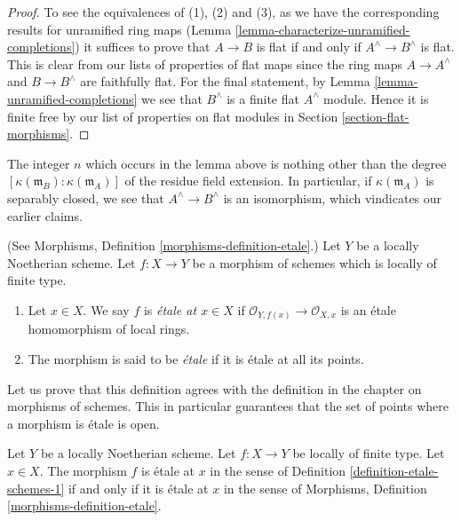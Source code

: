 \begin{proof}
To see the equivalences of (1), (2) and (3), as we have the corresponding
results for unramified ring maps
(Lemma \ref{lemma-characterize-unramified-completions})
it suffices to prove that
$A \to B$ is flat if and only if $A^\wedge \to B^\wedge$ is flat.
This is clear from our lists of properties of flat maps since
the ring maps $A \to A^\wedge$ and $B \to B^\wedge$ are faithfully flat.
For the final statement, by Lemma \ref{lemma-unramified-completions}
we see that $B^\wedge$ is a finite flat $A^\wedge$ module.
Hence it is finite free by our list
of properties on flat modules in Section \ref{section-flat-morphisms}.
\end{proof}

\noindent
The integer $n$ which occurs in the lemma above
is nothing other than the degree
$[\kappa(\mathfrak m_B) : \kappa(\mathfrak m_A)]$ of the residue field
extension. In particular, if $\kappa(\mathfrak m_A)$
is separably closed, we see that $A^\wedge \to B^\wedge$
is an isomorphism, which vindicates our earlier claims.

\begin{definition}
\label{definition-etale-schemes-1}
(See Morphisms, Definition \ref{morphisms-definition-etale}.)
Let $Y$ be a locally Noetherian scheme.
Let $f : X \to Y$ be a morphism of schemes which is locally of finite type.
\begin{enumerate}
\item Let $x \in X$. We say $f$ is {\it \'etale at $x \in X$} if
$\mathcal{O}_{Y, f(x)} \to \mathcal{O}_{X, x}$ is an
\'etale homomorphism of local rings.
\item The morphism is said to be {\it \'etale} if it is \'etale at all its
points.
\end{enumerate}
\end{definition}

\noindent
Let us prove that this definition agrees with the definition in the
chapter on morphisms of schemes. This in particular guarantees that the
set of points where a morphism is \'etale is open.

\begin{lemma}
\label{lemma-etale-definition}
Let $Y$ be a locally Noetherian scheme.
Let $f : X \to Y$ be locally of finite type.
Let $x \in X$. The morphism $f$ is \'etale at $x$ in
the sense of Definition \ref{definition-etale-schemes-1}
if and only if it is \'etale at $x$ in
the sense of Morphisms, Definition \ref{morphisms-definition-etale}.
\end{lemma}


